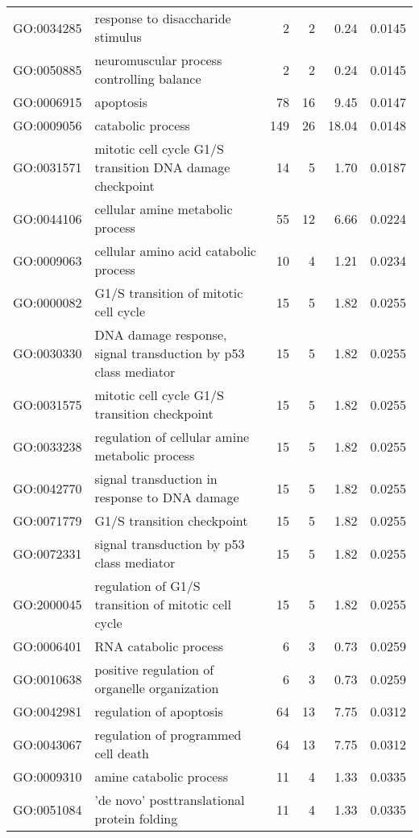 \begin{longtable}{lp{4.5cm}rrrl}
  GO:0034285 & response to disaccharide stimulus &   2 &   2 & 0.24 & 0.0145 \\ 
  GO:0050885 & neuromuscular process controlling balance &   2 &   2 & 0.24 & 0.0145 \\ 
  GO:0006915 & apoptosis &  78 &  16 & 9.45 & 0.0147 \\ 
  GO:0009056 & catabolic process & 149 &  26 & 18.04 & 0.0148 \\ 
  GO:0031571 & mitotic cell cycle G1/S transition DNA damage checkpoint &  14 &   5 & 1.70 & 0.0187 \\ 
  GO:0044106 & cellular amine metabolic process &  55 &  12 & 6.66 & 0.0224 \\ 
  GO:0009063 & cellular amino acid catabolic process &  10 &   4 & 1.21 & 0.0234 \\ 
  GO:0000082 & G1/S transition of mitotic cell cycle &  15 &   5 & 1.82 & 0.0255 \\ 
  GO:0030330 & DNA damage response, signal transduction by p53 class mediator &  15 &   5 & 1.82 & 0.0255 \\ 
  GO:0031575 & mitotic cell cycle G1/S transition checkpoint &  15 &   5 & 1.82 & 0.0255 \\ 
  GO:0033238 & regulation of cellular amine metabolic process &  15 &   5 & 1.82 & 0.0255 \\ 
  GO:0042770 & signal transduction in response to DNA damage &  15 &   5 & 1.82 & 0.0255 \\ 
  GO:0071779 & G1/S transition checkpoint &  15 &   5 & 1.82 & 0.0255 \\ 
  GO:0072331 & signal transduction by p53 class mediator &  15 &   5 & 1.82 & 0.0255 \\ 
  GO:2000045 & regulation of G1/S transition of mitotic cell cycle &  15 &   5 & 1.82 & 0.0255 \\ 
  GO:0006401 & RNA catabolic process &   6 &   3 & 0.73 & 0.0259 \\ 
  GO:0010638 & positive regulation of organelle organization &   6 &   3 & 0.73 & 0.0259 \\ 
  GO:0042981 & regulation of apoptosis &  64 &  13 & 7.75 & 0.0312 \\ 
  GO:0043067 & regulation of programmed cell death &  64 &  13 & 7.75 & 0.0312 \\ 
  GO:0009310 & amine catabolic process &  11 &   4 & 1.33 & 0.0335 \\ 
  GO:0051084 & 'de novo' posttranslational protein folding &  11 &   4 & 1.33 & 0.0335 \\ 

\end{longtable}
